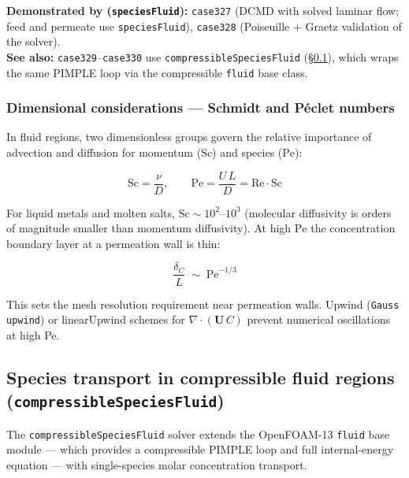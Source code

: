 \documentclass[11pt,a4paper]{article}
\newcommand{\caseref}[1]{\texttt{\color{casegreen}#1}}
\begin{document}
\begin{tcolorbox}[casebox]
  \textbf{Demonstrated by (\texttt{speciesFluid}):}
  \caseref{case327} (DCMD with solved laminar flow; feed and permeate use
  \texttt{speciesFluid}),
  \caseref{case328} (Poiseuille + Graetz validation of the solver).\\
  \textbf{See also:} \caseref{case329}–\caseref{case330} use
  \texttt{compressibleSpeciesFluid} (§\ref{sec:compfluid}), which wraps the
  same PIMPLE loop via the compressible \texttt{fluid} base class.
\end{tcolorbox}

\subsubsection{Dimensional considerations — Schmidt and Péclet numbers}

In fluid regions, two dimensionless groups govern the relative importance of
advection and diffusion for momentum ($\mathrm{Sc}$) and species
($\mathrm{Pe}$):

\begin{equation}
  \mathrm{Sc} = \frac{\nu}{D}, \qquad
  \mathrm{Pe} = \frac{U\,L}{D} = \mathrm{Re}\cdot\mathrm{Sc}
\end{equation}

For liquid metals and molten salts, $\mathrm{Sc}\sim 10^2$--$10^3$ (molecular
diffusivity is orders of magnitude smaller than momentum diffusivity).  At high
$\mathrm{Pe}$ the concentration boundary layer at a permeation wall is thin:

\begin{equation}
  \frac{\delta_C}{L} \;\sim\; \mathrm{Pe}^{-1/3}
\end{equation}

This sets the mesh resolution requirement near permeation walls.
Upwind (\texttt{Gauss upwind}) or linearUpwind schemes for
$\nabla\cdot(\mathbf{U}\,C)$ prevent numerical oscillations at high Pe.

\subsection{Species transport in compressible fluid regions (\texttt{compressibleSpeciesFluid})}
\label{sec:compfluid}

The \texttt{compressibleSpeciesFluid} solver extends the OpenFOAM-13
\texttt{fluid} base module — which provides a compressible PIMPLE loop and
full internal-energy equation — with single-species molar concentration
transport.
\end{document}
